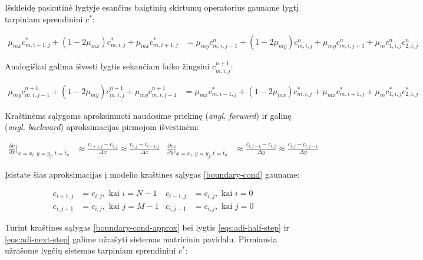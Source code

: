 Išskleidę paskutinė lygtyje esančius baigtinių skirtumų operatorius gauname lygtį tarpiniam sprendiniui $c^*$:

\begin{align}
  \mu_{mx}c^{*}_{m,i-1,j}+(1-2\mu_{mx})c^{*}_{m,i,j}+\mu_{mx}c^{*}_{m,i+1,j}
  &= \mu_{my}c^n_{m,i,j-1}+(1-2\mu_{my})c^n_{m,i,j}+\mu_{my}c^n_{m,i,j+1}+\mu_m c^n_{1,i,j}c^n_{2,i,j}
\end{align}

Analogiškai galima išvesti lygtis sekančiam laiko žingsiui $c^{n+1}_{m,i,j}$:

\begin{align}
  \mu_{my}c^{n+1}_{m,i,j-1}+(1-2\mu_{my})c^{n+1}_{m,i,j}+\mu_{my}c^{n+1}_{m,i,j+1}
  &= \mu_{mx}c^*_{m,i-1,j}+(1-2\mu_{mx})c^*_{m,i,j}+\mu_{mx}c^*_{m,i+1,j}+\mu_m c^*_{1,i,j}c^*_{2,i,j}
\end{align}

Kraštinėms sąlygoms aproksimuoti naudosime priekinę (\textit{angl. forward}) ir galinę (\textit{angl. backward}) aproksimacijas pirmojom išvestinėm:

\begin{align*}
  \frac{\partial c}{\partial x}\Big|_{x=x_i, y=y_j, t=t_n} 
  &\approx \frac{c_{i+1,j}-c_{i,j}}{\Delta x} 
  \approx \frac{c_{i,j}-c_{i-1,j}}{\Delta x} &
  \frac{\partial c}{\partial y}\Big|_{x=x_i, y=y_j, t=t_n} 
  &\approx \frac{c_{i,j+1}-c_{i,j}}{\Delta y} 
  \approx \frac{c_{i,j}-c_{i,j-1}}{\Delta y}
\end{align*}

Įsistate šias aproksimacijas į modelio kraštines sąlygas \eqref{boundary-cond} gauname:

\begin{subequations} \label{boundary-cond-approx}
\begin{align} 
  c_{i+1,j} &= c_{i,j}, \text{ kai } i = N - 1 &
  c_{i-1,j} &= c_{i,j}, \text{ kai } i = 0\\
  c_{i,j+1} &= c_{i,j}, \text{ kai } j = M - 1 &
  c_{i,j-1} &= c_{i,j}, \text{ kai } j = 0
\end{align}
\end{subequations}

Turint kraštines sąlygas \eqref{boundary-cond-approx} bei lygtis \eqref{eqs:adi-half-step} ir \eqref{eqs:adi-next-step} galime užrašyti sistemas matriciniu pavidalu. Pirmiausia užrašome lygčių sistemas tarpiniam sprendiniui $c^*$:

